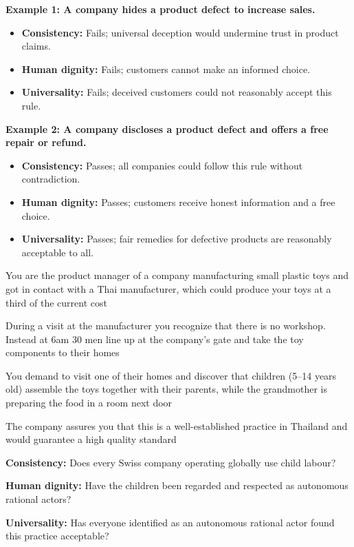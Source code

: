 \documentclass{article}
\begin{document}
\textbf{Example 1: A company hides a product defect to increase sales.}
\begin{itemize}
    \item \textbf{Consistency:} Fails; universal deception would undermine trust in product claims.
    \item \textbf{Human dignity:} Fails; customers cannot make an informed choice.
    \item \textbf{Universality:} Fails; deceived customers could not reasonably accept this rule.
\end{itemize}

\textbf{Example 2: A company discloses a product defect and offers a free repair or refund.}
\begin{itemize}
    \item \textbf{Consistency:} Passes; all companies could follow this rule without contradiction.
    \item \textbf{Human dignity:} Passes; customers receive honest information and a free choice.
    \item \textbf{Universality:} Passes; fair remedies for defective products are reasonably acceptable to all.
\end{itemize}

\newpage
{}
You are the product manager of a company manufacturing small plastic toys and
got in contact with a Thai manufacturer, which could produce your toys at a third
of the current cost

During a visit at the manufacturer you recognize that there is no workshop.
Instead at 6am 30 men line up at the company's gate and take the toy
components to their homes

You demand to visit one of their homes and discover that children (5--14 years
old) assemble the toys together with their parents, while the grandmother is
preparing the food in a room next door

The company assures you that this is a well-established practice in Thailand and
would guarantee a high quality standard

\textbf{Consistency:} Does every Swiss company operating globally use child labour?

\textbf{Human dignity:} Have the children been regarded and respected as autonomous rational actors?

\textbf{Universality:} Has everyone identified as an autonomous rational actor found this practice acceptable?
\end{document}
